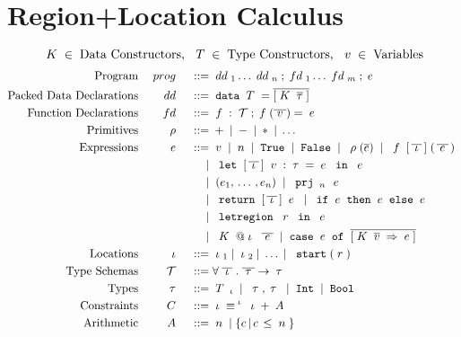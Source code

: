 \documentclass[12pt]{article}
\makeatletter
\newcommand{\gramdef}{\; ::= \;}
\newcommand{\gramor}{\; | \;}
\newcommand{\PROG}{\keywd{prog}}
\newcommand{\EXPR}{\keywd{e}}
\newcommand{\PRIM}{\keywd{\rho}}
\newcommand{\TYP}{\keywd{\tau}}
\newcommand{\STYP}{\keywd{\mathcal{T}}}
\newcommand{\DD}{\keywd{dd}}
\newcommand{\VD}{\keywd{vd}}
\newcommand{\FD}{\keywd{fd}}
\newcommand{\TC}{\keywd{T}}
\newcommand{\DC}{\keywd{K}}
\newcommand{\DATA}{\gramwd{data}}
\newcommand{\sTYP}{\skeywd{\tau}}
\newcommand{\sEXPR}{\skeywd{e}}
\newcommand{\skeywd}[1]{#1}
\newcommand{\keywd}[1]{\; {#1} \;}
\newcommand{\gramwd}[1]{\; \texttt{#1} \;}
\newcommand{\pairtype}[2]{\; {#1}, {#2} \;}
\newcommand{\case}[2]{\gramwd{case}\; #1\; \gramwd{of}\; #2 \;}
\newcommand{\bind}[2]{{#1} \Rightarrow {#2}}
\newcommand{\var}{\; \svar \;}
\newcommand{\svar}{v}
\newcommand{\fvar}{\; \sfvar \;}
\newcommand{\sfvar}{f}
\newcommand{\num}{\; n \;}
\newcommand{\primexpr}[1]{\; \PRIM(#1) \;}
\newcommand{\ife}[3]{\; \gramwd{if}#1\gramwd{then}#2\gramwd{else}#3 \;}
\newcommand{\mapp}[3]{\; #1\;[\,#2\,]\;(\,#3\,) \;}
\newcommand{\return}[2]{\; \gramwd{return}\;[\,#1\,]\;#2\;}
\newcommand{\project}[2]{\; \gramwd{prj}_{#1}\,{#2}\;}
\newcommand{\letlexpr}[4]{\;\gramwd{let} \; [\,#1\,]\; #2 = #3 \; \gramwd{in} \; #3 \;}
\newcommand{\letregion}[2]{\; \gramwd{letregion}\;#1\; \gramwd{in}\; #2 \;}
\newcommand{\mkdata}[3]{\; #1\;#2\;\;#3 \;}
\newcommand{\LOC}{\keywd{\iota}}
\newcommand{\REG}{\keywd{r}}
\newcommand{\atloc}[1]{@#1}
\newcommand{\lstart}[1]{\; \gramwd{start}(#1) \;}
\newcommand{\CONSTR}{\keywd{C}}
\newcommand{\A}{\keywd{A}}
\makeatother
\begin{document}
\section{Region+Location Calculus}
\begin{displaymath}
    \DC \in \; \textup{Data Constructors}, \:\: \TC \in \; \textup{Type Constructors}, \:\: \var \in \; \textup{Variables}
\end{displaymath} 
\begin{displaymath}
  \begin{aligned}
      \textup{Program} && \PROG && \gramdef & \DD_1 \ldots \DD_n \; ; 
                          \FD_1 \ldots \FD_m \; ; \EXPR \\
      \textup{Packed Data Declarations} && \DD && \gramdef & \DATA \TC = \overline{[\DC \; \overline{\sTYP}\;]} \\    
      \textup{Function Declarations} && \FD && \gramdef & \fvar : \STYP ; \fvar(\overline{\var}) = \EXPR \\
      \textup{Primitives} && \PRIM && \gramdef & + \gramor - \gramor * \gramor \ldots \\
      \textup{Expressions} && \EXPR && \gramdef & \var \gramor \num \gramor \gramwd{True} \gramor \gramwd{False} \gramor
            \primexpr{\overline{\sEXPR}} \gramor \mapp{\fvar}{\overline{\LOC}}{\overline{\EXPR}} \\
      && && \gramor & \letlexpr{\overline{\LOC}}{\var:\TYP}{\EXPR}{\EXPR} \\
      && && \gramor & \;(e_1,\, \dots\, , e_n)\; \gramor \project{\num}{\EXPR} \\
      && && \gramor & \return{\overline{\LOC}}{\EXPR} \gramor \ife{\EXPR}{\EXPR}{\EXPR} \\
      && && \gramor & \letregion{\REG}{\EXPR} \\
      && && \gramor & \mkdata{\DC}{\atloc{\LOC}}{\overline{\EXPR}} \gramor \case{\sEXPR}{\overline{[\bind{\DC \; \overline{\svar} \;}{\EXPR}]}} \\
      \textup{Locations} && \LOC && \gramdef & \LOC_1 \gramor \LOC_2 \gramor \ldots \gramor \lstart{\REG} \\
      \textup{Type Schemas} && \STYP && \gramdef & \forall\;\overline{\LOC}\;.\;\overline{\TYP}\rightarrow\TYP \\
      \textup{Types} && \TYP && \gramdef & \TC_{\LOC} \gramor \pairtype{\TYP}{\TYP} \gramor \gramwd{Int} \gramor \gramwd{Bool} \\
      \textup{Constraints} && \CONSTR && \gramdef & \LOC \equiv^{\LOC} \LOC + \A \\
      \textup{Arithmetic} && \A && \gramdef & \num \gramor \{ c\, |\, c \, \leq \num \}
  \end{aligned}
\end{displaymath}
\end{document}
